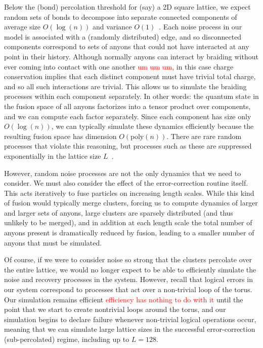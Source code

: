 \documentclass[aps, prl, letterpaper, twocolumn, superscriptaddress, notitlepage, 10pt]{revtex4-1}
\newcommand{\dude}[1]{\textcolor{red}{#1}}
\begin{document}
Below the (bond) percolation threshold for (say) a 2D square lattice, we expect random sets of 
bonds to decompose into separate connected components 
of average size $O(\log(n))$ and variance $O(1)$~\cite{Bazant2000}.
Each noise process in our model is associated with a (randomly distributed) edge, and so 
disconnected components correspond to sets of anyons that could not have interacted at any 
point in their history. 
Although normally anyons can interact by braiding without ever coming 
into contact with one another \dude{um um um}, in this case charge conservation 
implies that each distinct component must have trivial total charge, and so all such interactions are trivial.
This allows us to simulate the braiding processes within each component 
separately. In other words: the quantum state in the fusion space of all anyons factorizes into 
a tensor product over components, and we can compute each factor separately. Since each 
component has size only $O(\log(n))$, we can typically simulate these dynamics efficiently 
because the resulting fusion space has dimension $O(\mathrm{poly}(n))$. There are rare 
random processes that violate this reasoning, but processes such as these are suppressed 
exponentially in the lattice size $L$~\cite{Grimmett1989}. 

However, random noise processes are not the only dynamics that we need to consider. We 
must also consider the effect of the error-correction routine itself. This acts iteratively to fuse 
particles on increasing length scales. While this kind of fusion would typically merge clusters, 
forcing us to compute dynamics of larger and larger sets of anyons, large clusters are sparsely distributed 
(and thus unlikely to be merged), and in addition at each length scale the total number of 
anyons present is dramatically reduced by fusion, leading to a smaller number of anyons that 
must be simulated.

Of course, if we were to consider noise so strong that 
the clusters percolate over the entire lattice, we would no 
longer expect to be able to efficiently simulate the noise and recovery processes in the system. 
However, recall that logical errors in our system correspond to processes that act over a non-trivial loop of the torus. 
Our simulation remains efficient \dude{efficiency has nothing to do with it}
until the point that we start to create nontrivial loops around the torus, 
and our simulation begins to declare failure whenever non-trivial logical 
operations occur, meaning that we can simulate large lattice sizes 
in the successful error-correction (sub-percolated) regime, including up to $L=128$.
\end{document}
